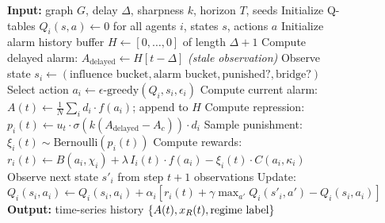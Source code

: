 \begin{figure}[ht]
\centering
\begin{minipage}{0.92\linewidth}
\begin{algorithmic}[1]
\small
\State \textbf{Input:} graph $G$, delay $\Delta$, sharpness $k$, horizon $T$, seeds
\State Initialize Q-tables $Q_i(s,a) \leftarrow 0$ for all agents $i$, states $s$, actions $a$
\State Initialize alarm history buffer $H \leftarrow [0, \ldots, 0]$ of length $\Delta + 1$
    \State Compute delayed alarm: $A_{\mathrm{delayed}} \leftarrow H[t - \Delta]$ \hfill\emph{(stale observation)}
        \State Observe state $s_i \leftarrow (\text{influence bucket}, \text{alarm bucket}, \text{punished?}, \text{bridge?})$
        \State Select action $a_i \leftarrow \epsilon\text{-greedy}(Q_i, s_i, \epsilon_i)$
    \EndFor
    \State Compute current alarm: $A(t) \leftarrow \frac{1}{N}\sum_i d_i \cdot f(a_i)$; append to $H$
    \State Compute repression: $p_i(t) \leftarrow u_t \cdot \sigma(k(A_{\mathrm{delayed}} - A_c)) \cdot d_i$
    \State Sample punishment: $\xi_i(t) \sim \mathrm{Bernoulli}(p_i(t))$
    \State Compute rewards: $r_i(t) \leftarrow B(a_i, \chi_i) + \lambda\, I_i(t) \cdot f(a_i) - \xi_i(t) \cdot C(a_i, \kappa_i)$
        \State Observe next state $s'_i$ from step $t{+}1$ observations
        \State Update: $Q_i(s_i, a_i) \leftarrow Q_i(s_i, a_i) + \alpha_i[r_i(t) + \gamma \max_{a'} Q_i(s'_i, a') - Q_i(s_i, a_i)]$
    \EndFor
\EndFor
\State \textbf{Output:} time-series history $\{A(t), x_R(t), \text{regime label}\}$
\end{algorithmic}
\end{minipage}
\label{alg:sim}
\end{figure}
